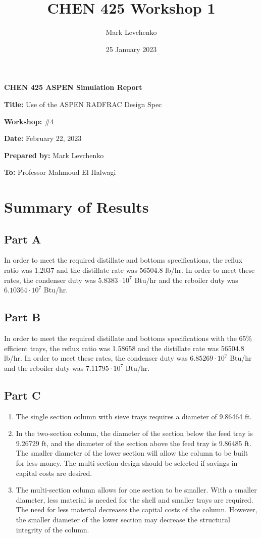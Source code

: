 \documentclass[12pt]{article}
\title{CHEN 425 Workshop 1}
\author{Mark Levchenko}
\date{25 January 2023}
\begin{document}

\textbf{CHEN 425 ASPEN Simulation Report}

\textbf{Title:} Use of the ASPEN RADFRAC Design Spec

\textbf{Workshop:} \#4

\textbf{Date:} February 22, 2023

\textbf{Prepared by:} Mark Levchenko

\textbf{To:} Professor Mahmoud El-Halwagi


\section{Summary of Results}
\subsection{Part A}
In order to meet the required distillate and bottoms specifications, the reflux ratio was 1.2037 and the distillate rate was 56504.8 lb/hr. In order to meet these rates, the condenser duty was $5.8383\cdot10^7$ Btu/hr and the reboiler duty was $6.10364\cdot10^7$ Btu/hr.

\subsection{Part B}
In order to meet the required distillate and bottoms specifications with the 65\% efficient trays, the reflux ratio was 1.58658 and the distillate rate was 56504.8 lb/hr. In order to meet these rates, the condenser duty was $6.85269\cdot10^7$ Btu/hr and the reboiler duty was $7.11795\cdot10^7$ Btu/hr.

\subsection{Part C}
\begin{enumerate}
    \item The single section column with sieve trays requires a diameter of 9.86464 ft.
    \item In the two-section column, the diameter of the section below the feed tray is 9.26729 ft, and the diameter of the section above the feed tray is 9.86485 ft. The smaller diameter of the lower section will allow the column to be built for less money. The multi-section design should be selected if savings in capital costs are desired.
    \item The multi-section column allows for one section to be smaller. With a smaller diameter, less material is needed for the shell and smaller trays are required. The need for less material decreases the capital costs of the column. However, the smaller diameter of the lower section may decrease the structural integrity of the column.
\end{enumerate}
\end{document}
